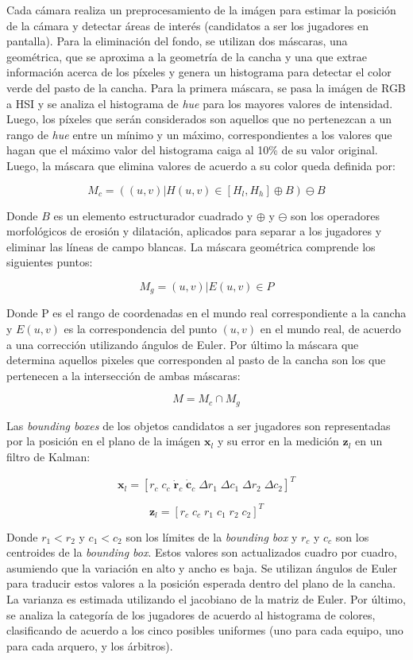 \documentclass[a4paper,10pt]{article}
\begin{document}
Cada cámara realiza un preprocesamiento de la imágen para estimar la posición de la cámara y
detectar áreas de interés (candidatos a ser los jugadores en pantalla). Para la eliminación
del fondo, se utilizan dos máscaras, una geométrica, que se aproxima a la geometría de la
cancha y una que extrae información acerca de los píxeles y genera un histograma para
detectar el color verde del pasto de la cancha. Para la primera máscara, se pasa la imágen de
RGB a HSI y se analiza el histograma de \textit{hue} para los mayores valores de intensidad.
Luego, los píxeles que serán considerados son aquellos que no pertenezcan a un rango de \textit{hue}
entre un mínimo y un máximo, correspondientes a los valores que hagan que el máximo valor
del histograma caiga al 10\% de su valor original.  Luego, la máscara que elimina valores
de acuerdo a su color queda definida por:

\[
  M_c = ({(u, v) | H(u, v) \in [H_l, H_h]} \oplus B ) \ominus B
\]

Donde $B$ es un elemento estructurador cuadrado y $\oplus$ y $\ominus$ son los operadores
morfológicos de erosión y dilatación, aplicados para separar a los jugadores y eliminar las
líneas de campo blancas. La máscara geométrica comprende los siguientes puntos:

\[
  M_g = { (u, v) | E(u, v)  \in P }
\]

Donde P es el rango de coordenadas en el mundo real correspondiente a la cancha y $E(u, v)$ es 
la correspondencia del punto $(u, v)$ en el mundo real, de acuerdo a una corrección utilizando
ángulos de Euler. Por último la máscara que determina aquellos pixeles que corresponden al
pasto de la cancha son los que pertenecen a la intersección de ambas máscaras:

\[
  M = M_c \cap M_g
\]

Las \textit{bounding boxes} de los objetos candidatos a ser jugadores son representadas por
la posición en el plano de la imágen $\mathbf{x}_l$ y su error en la medición $\mathbf{z}_l$ en
un filtro de Kalman:

\[
\mathbf{x}_l = [r_c \; c_c \;  \mathbf{\dot r}_c  \; \mathbf{\dot c}_c \;  \Delta r_1  \; \Delta c_1 \;  \Delta r_2 \;  \Delta c_2]^T
\]

\[
\mathbf{z}_l = [r_c \;  c_c  \; r_1  \; c_1  \; r_2  \; c_2]^T
\]

Donde $r_1 < r_2$ y $c_1 < c_2$ son los límites de la \textit{bounding box} y $r_c$ y $c_c$ son los
centroides de la \textit{bounding box}. Estos valores son actualizados cuadro por cuadro,
asumiendo que la variación en alto y ancho es baja. Se utilizan ángulos de Euler para
traducir estos valores a la posición esperada dentro del plano de la cancha. La varianza es estimada
utilizando el jacobiano de la matriz de Euler. Por último, se analiza la categoría de los
jugadores de acuerdo al histograma de colores, clasificando de acuerdo a los cinco posibles uniformes
(uno para cada equipo, uno para cada arquero, y los árbitros).
\end{document}

